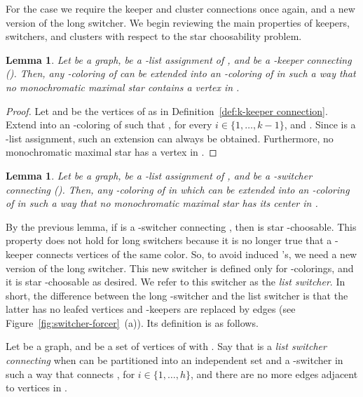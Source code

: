 \documentclass[a4paper, 11pt, oneside]{article}
\newtheorem{lemma}[theorem]{Lemma}
\newcommand{\range}[3]{\ensuremath{#1 \in \{#2,\ldots,#3\}}}
\let\Definition=\emph
\begin{document}
For the case  we require the keeper and cluster connections once again, and a new version of the long switcher.  We begin reviewing the main properties of keepers, switchers, and clusters with respect to the star choosability problem.

\begin{lemma}\label{lem:keeper choosability}
 Let  be a graph,  be a -list assignment of , and  be a -keeper connecting  ().  Then, any -coloring  of  can be extended into an -coloring of  in such a way that no monochromatic maximal star contains a vertex in .
\end{lemma}

\begin{proof}
 Let  and  be the vertices of  as in Definition~\ref{def:k-keeper connection}.  Extend  into an -coloring of  such that ,  for every \range{i}{1}{k-1}, and .  Since  is a -list assignment, such an extension can always be obtained.  Furthermore, no monochromatic maximal star has a vertex in .
\end{proof}

\begin{lemma}\label{lem:switcher choosability}
 Let  be a graph,  be a -list assignment of , and  be a -switcher connecting  ().  Then, any -coloring  of  in which  can be extended into an -coloring of  in such a way that no monochromatic maximal star has its center in .
\end{lemma}

By the previous lemma, if  is a -switcher connecting , then  is star -choosable.  This property does not hold for long switchers because it is no longer true that a -keeper connects vertices of the same color.  So, to avoid induced 's, we need a new version of the long switcher.  This new switcher is defined only for -colorings, and it is star -choosable as desired.  We refer to this switcher as the \Definition{list switcher}.  In short, the difference between the long -switcher and the list switcher is that the latter has no leafed vertices and -keepers are replaced by edges (see Figure~\ref{fig:switcher-forcer}~(a)).  Its definition is as follows.

\begin{defn}\label{def:list switcher}
  Let  be a graph, and  be a set of vertices of  with .  Say that  is a \Definition{list switcher connecting } when  can be partitioned into an independent set  and a -switcher  in such a way that  connects ,  for \range{i}{1}{h}, and there are no more edges adjacent to vertices in .
\end{defn}
\end{document}
